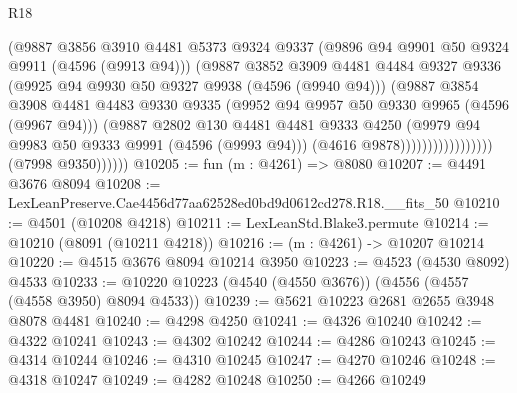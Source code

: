 \begin{lexlean}{R18}
\begin{coremodule}
                                      (@9887
                                        @3856
                                        @3910
                                        @4481
                                        @5373
                                        @9324
                                        @9337
                                        (@9896 @94 @9901 @50 @9324 @9911 (@4596 (@9913 @94)))
                                        (@9887
                                          @3852
                                          @3909
                                          @4481
                                          @4484
                                          @9327
                                          @9336
                                          (@9925 @94 @9930 @50 @9327 @9938 (@4596 (@9940 @94)))
                                          (@9887
                                            @3854
                                            @3908
                                            @4481
                                            @4483
                                            @9330
                                            @9335
                                            (@9952 @94 @9957 @50 @9330 @9965 (@4596 (@9967 @94)))
                                            (@9887
                                              @2802
                                              @130
                                              @4481
                                              @4481
                                              @9333
                                              @4250
                                              (@9979 @94 @9983 @50 @9333 @9991 (@4596 (@9993 @94)))
                                              (@4616 @9878)))))))))))))))))
              (@7998 @9350))))))
@10205 := fun (m : @4261) => @8080
@10207 := @4491 @3676 @8094
@10208 := LexLeanPreserve.Cae4456d77aa62528ed0bd9d0612cd278.R18.__fits_50
@10210 := @4501 (@10208 @4218)
@10211 := LexLeanStd.Blake3.permute
@10214 := @10210 (@8091 (@10211 @4218))
@10216 := (m : @4261) -> @10207 @10214
@10220 := @4515 @3676 @8094 @10214 @3950
@10223 := @4523 (@4530 @8092) @4533
@10233 := @10220 @10223 (@4540 (@4550 @3676)) (@4556 (@4557 (@4558 @3950) @8094 @4533))
@10239 := @5621 @10223 @2681 @2655 @3948 @8078 @4481
@10240 := @4298 @4250
@10241 := @4326 @10240
@10242 := @4322 @10241
@10243 := @4302 @10242
@10244 := @4286 @10243
@10245 := @4314 @10244
@10246 := @4310 @10245
@10247 := @4270 @10246
@10248 := @4318 @10247
@10249 := @4282 @10248
@10250 := @4266 @10249

\end{coremodule}
\end{lexlean}

